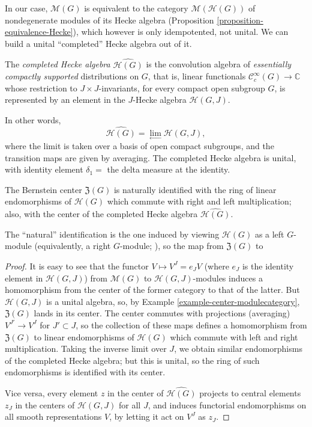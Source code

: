 In our case, $\mathcal M(G)$ is equivalent to the category $\mathcal M(\mathcal H(G))$ of nondegenerate modules of its Hecke algebra (Proposition \ref{proposition-equivalence-Hecke}), which however is only idempotented, not unital. We can build a unital ``completed'' Hecke algebra out of it.

\begin{definition}
   \label{definition-completed-Hecke}
The {\it completed Hecke algebra} $\widehat{\mathcal H(G)}$ is the convolution algebra of {\it essentially compactly supported} distributions on $G$, that is, linear functionals $\mathcal C_c^\infty(G)\to \mathbb C$ whose restriction to $J\times J$-invariants, for every compact open subgroup $G$, is represented by an element in the $J$-Hecke algebra $\mathcal H(G,J)$. 
\end{definition}

In other words, 
\begin{equation}
   \label{equation-completed-Hecke}
	\widehat{\mathcal H(G)} = \underset{\leftarrow}{\lim} \mathcal H(G,J),
\end{equation}
where the limit is taken over a basis of open compact subgroups, and the transition maps are given by averaging. The completed Hecke algebra is unital, with identity element $\delta_1=$ the delta measure at the identity.


\begin{proposition}
	\label{proposition-center-Hecke}
	The Bernstein center $\mathfrak Z(G)$ is naturally identified with the ring of linear endomorphisms of $\mathcal H(G)$ which commute with right and left multiplication; also, with the center of the completed Hecke algebra $\widehat{\mathcal H(G)}$.
\end{proposition}

The ``natural'' identification is the one induced by viewing $\mathcal H(G)$ as a left $G$-module (equivalently, a right $G$-module; ), so the map from $\mathfrak Z(G)$ to 


\begin{proof}
	It is easy to see that the functor $V\mapsto V^J = e_J V$ (where $e_J$ is the identity element in $\mathcal H(G,J)$) from $\mathcal M(G)$ to $\mathcal H(G,J)$-modules induces a homomorphism from the center of the former category to that of the latter. But $\mathcal H(G,J)$ is a unital algebra, so, by Example \ref{example-center-modulecategory}, $\mathfrak Z(G)$ lands in its center. The center commutes with projections (averaging) $V^{J'}\to V^J$ for $J'\subset J$, so the collection of these maps defines a homomorphism from $\mathfrak Z(G)$ to linear endomorphisms of $\mathcal H(G)$ which commute with left and right multiplication. Taking the inverse limit over $J$, we obtain similar endomorphisms of the completed Hecke algebra; but this is unital, so the ring of such endomorphisms is identified with its center. 
	
	Vice versa, every element $z$ in the center of $\widehat{\mathcal H(G)}$ projects to central elements $z_J$ in the centers of $\mathcal H(G,J)$ for all $J$, and induces functorial endomorphisms on all smooth representations $V$, by letting it act on $V^J$ as $z_J$. 
\end{proof}

